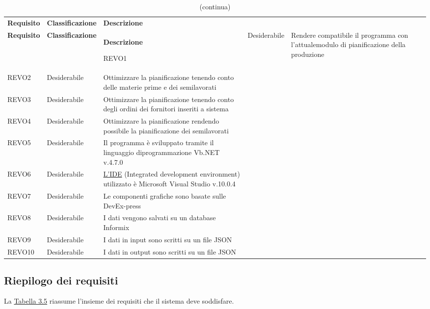 \begin{longtable}{ >{\centering}p{} >{\centering}p{}
		>{\raggedright}p{} >{\centering}p{}}
	\caption{Tabella dei requisiti prestazionali}
	\label{3.4}
	\\
	\rowcolorhead 
	\textbf{\color{white}Requisito} 
	& \textbf{\color{white}Classificazione} 
	& \centering\textbf{\color{white}Descrizione}
	 
	\endfirsthead
	\caption[]{(continua)}\\
	\rowcolorhead 
	\textbf{\color{white}Requisito} 
	& \textbf{\color{white}Classificazione} 
	& \centering\textbf{\color{white}Descrizione}
	
	\endhead	
	
	REVO1	&	Desiderabile	&    Rendere compatibile il programma con l’attualemodulo di pianificazione della produzione	 \tabularnewline
	REVO2	&	Desiderabile	&    Ottimizzare la pianificazione tenendo conto delle materie prime e dei semilavorati	 \tabularnewline
	REVO3	&	Desiderabile	&    Ottimizzare la pianificazione tenendo conto degli ordini dei fornitori inseriti a sistema	 \tabularnewline
	REVO4	&	Desiderabile	&    Ottimizzare la pianificazione rendendo possibile la pianificazione dei semilavorati	 \tabularnewline
	REVO5	&	Desiderabile	&    Il programma è sviluppato tramite il linguaggio diprogrammazione Vb.NET v.4.7.0	 \tabularnewline
	REVO6	&	Desiderabile	&    \hyperref[IDE]{L’IDE\glo} (Integrated development environment) utilizzato è Microsoft Visual Studio v.10.0.4	 \tabularnewline
	REVO7	&	Desiderabile	&    Le componenti grafiche sono basate sulle DevEx-press	 \tabularnewline
	REVO8	&	Desiderabile	&    I dati vengono salvati su un database Informix	 \tabularnewline
	REVO9	&	Desiderabile	&    I dati in input sono scritti su un file JSON	 \tabularnewline
	REVO10	&	Desiderabile	&    I dati in output sono scritti su un file JSON	 \tabularnewline

\end{longtable}

\newpage
\subsection{Riepilogo dei requisiti}

La \hyperref[3.5]{Tabella 3.5} riassume l'insieme dei requisiti che il sistema deve soddisfare.


